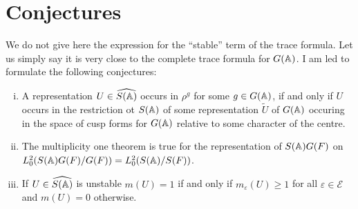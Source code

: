 \section{Conjectures}
\label{sec:conjectures}

We do not give here the expression for the ``stable'' term of the trace formula.
Let us simply say it is very close to the complete trace formula for $G(\mathbb{A})$.
I am led to formulate the following conjectures:
\begin{enumerate}[(i)]
    \item A representation $U \in \widehat{S(\mathbb{A})}$ occurs in $\rho^g$ for some $g \in G(\mathbb{A})$, if and only if $U$ occurs in the restriction ot $S(\mathbb{A})$ of some representation $\widetilde{U}$ of $G(\mathbb{A})$ occuring in the space of cusp forms for $G(\mathbb{A})$ relative to some character of the centre.
    \item The multiplicity one theorem is true for the representation of $S(\mathbb{A})G(F)$ on $L^2_0(S(\mathbb{A}) G(F) / G(F)) = L^2_0(S(\mathbb{A}) / S(F))$.
    \item If $U \in \widehat{S(\mathbb{A})}$ is unstable $m(U) = 1$ if and only if $m_\varepsilon(U) \ge 1$ for all $\varepsilon \in \mathscr{E}$ and $m(U) = 0$ otherwise.
\end{enumerate}
